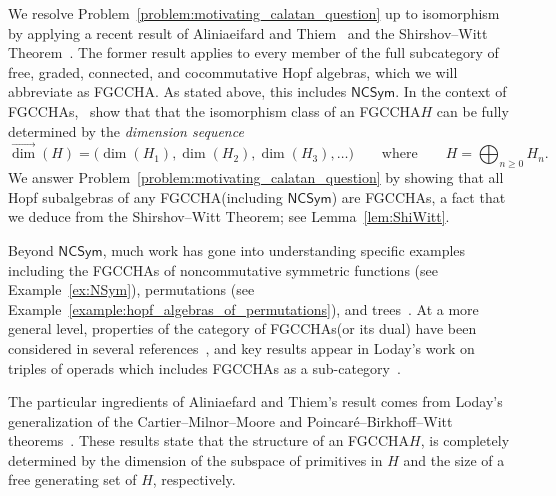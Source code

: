\documentclass[11pt]{amsart}
\theoremstyle{definition}
\newtheorem{problem}[theorem]{Problem}
\numberwithin{equation}{section}
\newcommand{\FGCCHA}{\textsf{FGCCHA}\xspace}
\newcommand{\FGCCHAs}{\textsf{FGCCHA}s\xspace}
\newcommand{\vecdim}{\overrightarrow{\dim}}
\newcommand{\NCSym}{\mathsf{NCSym}}
\begin{document}
%   

We resolve Problem~\ref{problem:motivating_calatan_question} up to isomorphism by applying a recent result of Aliniaeifard and Thiem~\cite{AT22} and the Shirshov--Witt Theorem~\cite{S09, Witt56}.  
The former result applies to every member of the full subcategory of free, graded, connected, and cocommutative Hopf algebras, which we will abbreviate as \FGCCHA.  
As stated above, this includes $\NCSym$.  
In the context of \FGCCHAs,~\cite[Theorem~12]{AT22} show that that the isomorphism class of an
\FGCCHA $H$ can be fully determined by the \emph{dimension sequence}
\[
\vecdim(H) = \big( \dim(H_{1}), \dim(H_{2}), \dim(H_{3}), \ldots \big)
\qquad\text{where}\qquad
H = \bigoplus_{n \ge 0} H_{n}.
\]
We answer Problem~\ref{problem:motivating_calatan_question} by showing that all Hopf subalgebras of any \FGCCHA (including $\NCSym$) are \FGCCHAs, a fact that we deduce from the Shirshov--Witt Theorem; see Lemma~\ref{lem:ShiWitt}.  


Beyond $\NCSym$, much work has gone into understanding specific examples including the \FGCCHAs of noncommutative symmetric functions (see Example~\ref{ex:NSym}), permutations (see Example~\ref{example:hopf_algebras_of_permutations}), and trees~\cite{AS05cc, GL09}.  
At a more general level, properties of the category of \FGCCHAs (or its dual) have been considered in several references~\cite{AT22, Block85, FP24, LodayRonco10, MM65, Reutenauer-FreeLieAlgebras}, and key results appear in Loday's work on triples of operads which includes \FGCCHAs as a sub-category~\cite[Section 4.1]{L08}.  

The particular ingredients of Aliniaefard and Thiem's result comes from Loday's generalization of the  Cartier--Milnor--Moore and Poincar\'{e}--Birkhoff--Witt theorems~\cite[Theorem 4.1.3]{L08}.  These results state that the structure of an \FGCCHA $H$, is completely determined by the dimension of the subspace of primitives in $H$ and the size of a free generating set of $H$, respectively.
\end{document}

